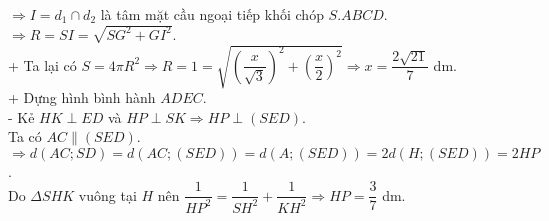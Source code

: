 \begin{ex}
{$\Rightarrow I = d_1 \cap d_2 $ là tâm mặt cầu ngoại tiếp khối chóp $ S.ABCD $.\\
$\Rightarrow R = SI = \sqrt{SG^2 + GI^2}$.\\
+ Ta lại có $ S = 4 \pi R^2 \Rightarrow R = 1 = \sqrt{\left(\dfrac{x}{\sqrt{3}}\right)^2 + \left(\dfrac{x}{2}\right)^2} \Rightarrow x = \dfrac{2\sqrt{21}}{7}$ dm.\\
+ Dựng hình bình hành $ADEC$.\\
- Kẻ $HK \perp ED$ và $ HP \perp SK \Rightarrow HP \perp (SED)$.\\
Ta có $ AC \parallel (SED)$.\\
$\Rightarrow d(AC; SD) = d(AC; (SED)) = d(A; (SED)) = 2d(H; (SED)) = 2HP$.\\
Do $\Delta SHK $ vuông tại $H$ nên $ \dfrac{1}{HP^2} = \dfrac{1}{SH^2} + \dfrac{1}{KH^2} \Rightarrow HP = \dfrac{3}{7}$ dm.	
	}
\end{ex}%
